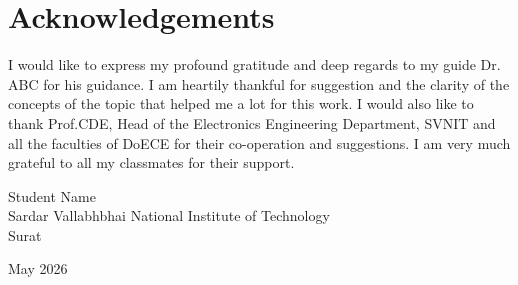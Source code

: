 
\chapter*{Acknowledgements}

I would like to express my profound gratitude and deep regards to my guide Dr. ABC for his guidance. I am heartily thankful for suggestion and the clarity of the concepts of the topic that helped me a lot for this work.
I would also like to thank Prof.CDE, Head of the Electronics Engineering Department, SVNIT  and all the faculties of DoECE for their co-operation and suggestions.
I am very much grateful to all my classmates for their support.

\begin{flushright} 
Student Name\\[0.01in]
Sardar Vallabhbhai National Institute of Technology\\
Surat\\
\end{flushright}

\begin{flushleft} 
May 2026 \\
\end{flushleft}

